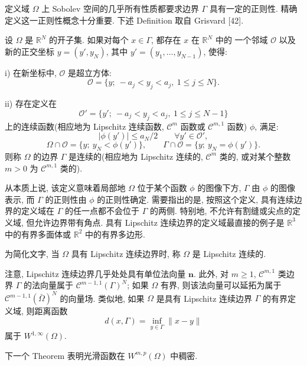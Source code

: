 定义域 $\Omega$ 上 Sobolev 空间的几乎所有性质都要求边界 $\Gamma$ 具有一定的正则性.
精确定义这一正则性概念十分重要. 下述 Definition 取自 Grisvard [42].

\setcounter{statement}{0}
\renewcommand{\theHstatement}{definition.\thesection.\arabic{statement}}
\begin{Definition}\label{def:continuous-lipschitz-cm-boundary}
设 $\Omega$ 是 $\mathbb R^N$ 的开子集. 如果对每个 $x\in\Gamma$, 都存在 $x$ 在 $\mathbb R^N$ 中的
一个邻域 $\mathcal O$ 以及新的正交坐标 $y=(y',y_N)$, 其中 $y'=(y_1,\ldots,y_{N-1})$, 使得:

i) 在新坐标中, $\mathcal O$ 是超立方体:
\[
  \mathcal O=\{y;\ -a_j<y_j<a_j,\ 1\leq j\leq N\}.
\]

ii) 存在定义在
\[
  \mathcal O'=\{y';\ -a_j<y_j<a_j,\ 1\leq j\leq N-1\}
\]
上的连续函数(相应地为 Lipschitz 连续函数, $\mathcal C^m$ 函数或 $\mathcal C^{m,1}$ 函数)
$\phi$, 满足:
\[
  |\phi(y')|\leq a_N/2\qquad\forall y'\in\mathcal O',
\]
\[
  \Omega\cap\mathcal O=\{y;\ y_N<\phi(y')\},
  \qquad
  \Gamma\cap\mathcal O=\{y;\ y_N=\phi(y')\}.
\]
则称 $\Omega$ 的边界 $\Gamma$ 是连续的(相应地为 Lipschitz 连续的, $\mathcal C^m$ 类的,
或对某个整数 $m>0$ 为 $\mathcal C^{m,1}$ 类的).
\end{Definition}

从本质上说, 该定义意味着局部地 $\Omega$ 位于某个函数 $\phi$ 的图像下方, $\Gamma$ 由 $\phi$ 的图像表示,
而 $\Gamma$ 的正则性由 $\phi$ 的正则性确定. 需要指出的是, 按照这个定义, 具有连续边界的定义域在
$\Gamma$ 的任一点都不会位于 $\Gamma$ 的两侧. 特别地, 不允许有割缝或尖点的定义域, 但允许边界带有角点.
具有 Lipschitz 连续边界的定义域最直接的例子是 $\mathbb R^3$ 中的有界多面体或 $\mathbb R^2$ 中的有界多边形.

为简化文字, 当 $\Omega$ 具有 Lipschitz 连续边界时, 称 $\Omega$ 是 Lipschitz 连续的.

注意, Lipschitz 连续边界几乎处处具有单位法向量 $\mathbf n$. 此外, 对 $m\geq1$,
$\mathcal C^{m,1}$ 类边界 $\Gamma$ 的法向量属于 $\mathcal C^{m-1,1}(\Gamma)^N$;
如果 $\Omega$ 有界, 则该法向量可以延拓为属于 $\mathcal C^{m-1,1}(\bar\Omega)^N$ 的向量场.
类似地, 如果 $\Omega$ 是具有 Lipschitz 连续边界 $\Gamma$ 的有界定义域, 则距离函数
\[
  d(x,\Gamma)=\inf_{y\in\Gamma}\|x-y\|
\]
属于 $W^{1,\infty}(\Omega)$.

下一个 Theorem 表明光滑函数在 $W^{m,p}(\Omega)$ 中稠密.
